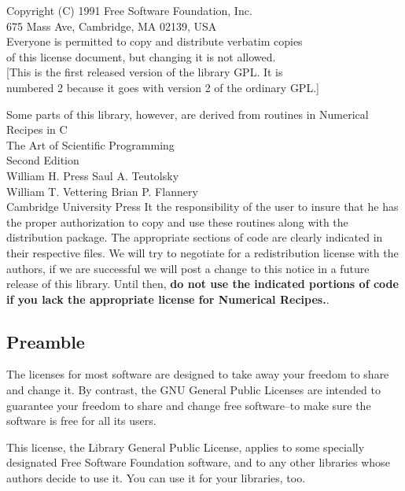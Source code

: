     Copyright (C) 1991 Free Software Foundation, Inc. \\
                    675 Mass Ave, Cambridge, MA 02139, USA \\
 Everyone is permitted to copy and distribute verbatim copies \\
 of this license document, but changing it is not allowed. \\[0.3em]

[This is the first released version of the library GPL.  It is \\
 numbered 2 because it goes with version 2 of the ordinary GPL.]
\ec     

Some parts of this library, however, are derived from routines in 
\bc
  {\sc 	Numerical Recipes in C } \\
  The Art of Scientific Programming \\
   Second Edition  \\ 
  William H. Press \hspace{2em}  Saul A. Teutolsky \\
  William T. Vettering \hspace{2em} Brian P. Flannery \\
  Cambridge University Press 
\ec
It the responsibility of the user to insure that he has the proper
authorization to copy and use these routines along with the
distribution package. The appropriate sections of code are clearly
indicated in their respective files. We will try to negotiate for a
redistribution license with the authors, if we are successful we will
post a change to this notice in a future release of this
library. Until then, {\bf do not use the indicated portions of code if you
lack the appropriate license for Numerical Recipes.}.

\subsection{Preamble}

  The licenses for most software are designed to take away your
freedom to share and change it.  By contrast, the GNU General Public
Licenses are intended to guarantee your freedom to share and change
free software--to make sure the software is free for all its users.

  This license, the Library General Public License, applies to some
specially designated Free Software Foundation software, and to any
other libraries whose authors decide to use it.  You can use it for
your libraries, too.

